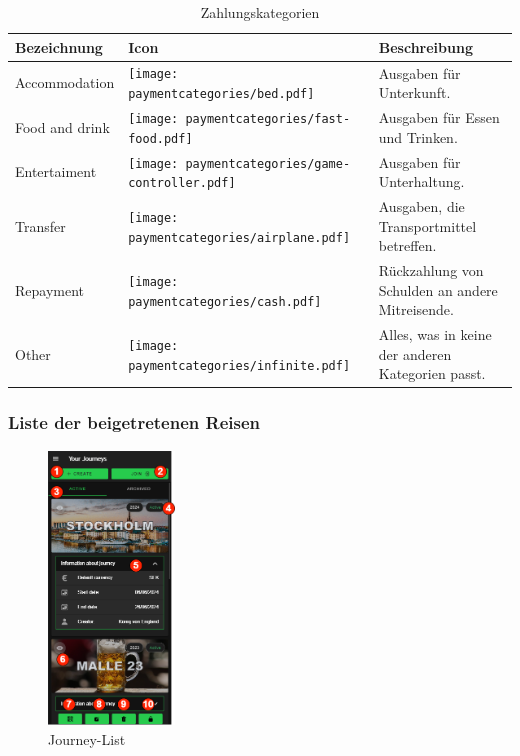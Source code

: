 \begin{table}[H]
	\caption{Zahlungskategorien}
	\begin{tabularx}{0.95\textwidth}{ |X|X|X| }
		\hline
		\rowcolor{gray} \textbf{Bezeichnung} & \textbf{Icon}                                                                 & Beschreibung                                    \\
		\hline
		Accommodation                        & \texttt{[image: paymentcategories/bed.pdf]}             &
		Ausgaben für Unterkunft.                                                                                                                                               \\
		\hline
		Food and drink                          & \texttt{[image: paymentcategories/fast-food.pdf]}       & Ausgaben für Essen und Trinken.                 \\
		\hline
		Entertaiment                         & \texttt{[image: paymentcategories/game-controller.pdf]} & Ausgaben für Unterhaltung.                      \\
		\hline
		Transfer                             & \texttt{[image: paymentcategories/airplane.pdf]}        & Ausgaben, die Transportmittel betreffen.         \\
		\hline
		Repayment                            & \texttt{[image: paymentcategories/cash.pdf]}            & Rückzahlung von Schulden an andere Mitreisende. \\
		\hline
		Other                                & \texttt{[image: paymentcategories/infinite.pdf]}        & Alles, was in keine der anderen Kategorien passt.      \\
		\hline
	\end{tabularx}
	\label{Tab:paymentcategories}
\end{table}

\subsubsection{Liste der beigetretenen Reisen}\label{Journey-List}
\begin{figure}[H]
	\centering
	\includegraphics[width=0.3\textwidth]{img/pages_numbers/journey-list.drawio}
	\caption[Journey-List]{Journey-List}
	\label{fig:Journey-List}
\end{figure}

